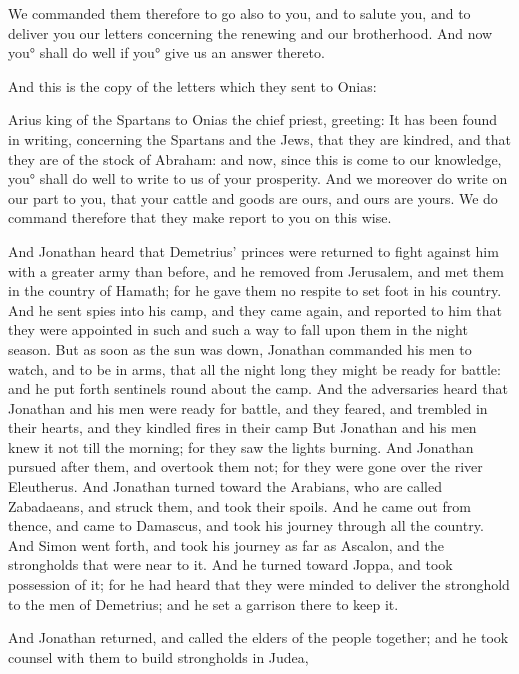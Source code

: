 {We commanded them therefore to go also to you, and to salute you, and to deliver you our letters concerning the renewing
{} and our brotherhood.
And now you° shall do well if you° give us an answer thereto.
\par }{\PP {}And this is the copy of the letters which they sent to Onias:
\par }{\PP {}Arius king of the Spartans to Onias the chief priest, greeting:
It has been found in writing, concerning the Spartans and the Jews, that they are kindred, and that they are of the stock of Abraham:
and now, since this is come to our knowledge, you° shall do well to write to us of your
 prosperity.
And we moreover do write on our part to you, that your cattle and goods are ours, and ours are yours. We do command therefore that they make report to you on this wise.
\par }{\PP {}And Jonathan heard that Demetrius’ princes were returned to fight against him with a greater army than before,
and he removed from Jerusalem, and met them in the country of Hamath; for he gave them no respite to set foot in his country.
And he sent spies into his camp, and they came again, and reported to him that they were appointed in such and such a way to fall upon them in the night season.
But as soon as the sun was down, Jonathan commanded his men to watch, and to be in arms, that all the night long they might be ready for battle: and he put forth sentinels round about the camp.
And the adversaries heard that Jonathan and his men were ready for battle, and they feared, and trembled in their hearts, and they kindled fires in their camp
But Jonathan and his men knew it not till the morning; for they saw the lights burning.
And Jonathan pursued after them, and overtook them not; for they were gone over the river Eleutherus.
And Jonathan turned toward the Arabians, who are called Zabadaeans, and struck them, and took their spoils.
And he came out from thence, and came to Damascus, and took his journey through all the country.
And Simon went forth, and took his journey as far as Ascalon, and the strongholds that were near to it. And he turned toward Joppa, and took possession of it;
for he had heard that they were minded to deliver the stronghold to the men of Demetrius; and he set a garrison there to keep it.
\par }{\PP {}And Jonathan returned, and called the elders of the people together; and he took counsel with them to build strongholds in Judea,
}
